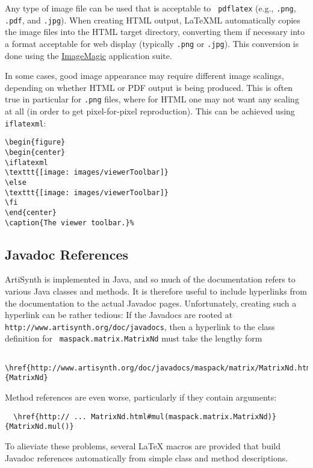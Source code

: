 \documentclass{article}
\begin{document}
Any type of image file can be used that is acceptable to {\tt
pdflatex} (e.g., {\tt .png}, {\tt .pdf}, and {\tt .jpg}). When creating
HTML output, LaTeXML automatically copies the image files into the
HTML target directory, converting them if necessary into a format
acceptable for web display (typically {\tt .png} or {\tt .jpg}). This
conversion is done using the
\href{http://www.imagemagick.org}{ImageMagic} application suite.

In some cases, good image appearance may require different image
scalings, depending on whether HTML or PDF output is being
produced. This is often true in particular for {\tt .png} files, where
for HTML one may not want any scaling at all (in order to get
pixel-for-pixel reproduction). This can be achieved using
{\tt \BKS iflatexml}:

\begin{lstlisting}[]
\begin{figure}
\begin{center}
\iflatexml
\texttt{[image: images/viewerToolbar]}
\else
\texttt{[image: images/viewerToolbar]}
\fi
\end{center}
\caption{The viewer toolbar.}%
\end{lstlisting}

\subsection{Javadoc References}
\label{JavadocRefsSec}

ArtiSynth is implemented in Java, and so much of the documentation
refers to various Java classes and methods. It is therefore useful to
include hyperlinks from the documentation to the actual Javadoc pages.
Unfortunately, creating such a hyperlink can be rather tedious: If the
Javadocs are rooted at {\tt http://www.artisynth.org/doc/javadocs},
then a hyperlink to the class definition for {\tt
maspack.matrix.MatrixNd} must take the lengthy form
\begin{verbatim}
  \href{http://www.artisynth.org/doc/javadocs/maspack/matrix/MatrixNd.html}{MatrixNd}
\end{verbatim}
Method references are even worse, particularly if they contain arguments:
\begin{verbatim}
  \href{http:// ... MatrixNd.html#mul(maspack.matrix.MatrixNd)}{MatrixNd.mul()}
\end{verbatim}
To alieviate these problems, several LaTeX macros are provided that
build Javadoc references automatically from simple class and
method descriptions.
\end{document}
